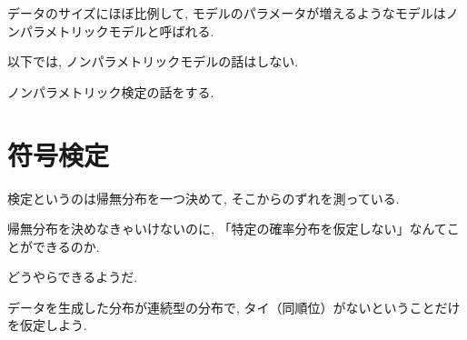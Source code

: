 \documentclass[11pt]{amsart}
\begin{document}
データのサイズにほぼ比例して, モデルのパラメータが増えるようなモデルはノンパラメトリックモデルと呼ばれる. 

以下では, ノンパラメトリックモデルの話はしない. 

ノンパラメトリック検定の話をする. 

\section{符号検定}

検定というのは帰無分布を一つ決めて, そこからのずれを測っている. 

帰無分布を決めなきゃいけないのに, 「特定の確率分布を仮定しない」なんてことができるのか. 

どうやらできるようだ.

データを生成した分布が連続型の分布で, タイ（同順位）がないということだけを仮定しよう.

 

\end{document}
